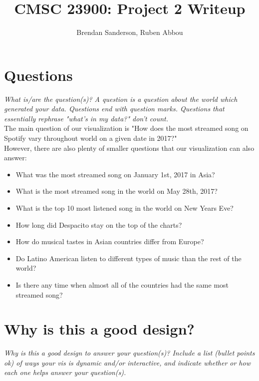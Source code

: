 \documentclass{article}
\begin{document}
\title{CMSC 23900: Project 2 Writeup}
\author{Brendan Sanderson, Ruben Abbou}
\maketitle

\section{Questions}
\textit{What is/are the question(s)? A question is a question about the world which generated your data. Questions end with question marks. Questions that essentially rephrase "what's in my data?" don't count.} \\

The main question of our visualization is "How does the most streamed song on Spotify vary throughout world on a given date in 2017?" \\

However, there are also plenty of smaller questions that our visualization can also answer:
\begin{itemize}
\item What was the most streamed song on January 1st, 2017 in Asia?
\item What is the most streamed song in the world on May 28th, 2017?
\item What is the top 10 most listened song in the world on New Years Eve?
\item How long did Despacito stay on the top of the charts?
\item How do musical tastes in Asian countries differ from Europe?
\item Do Latino American listen to different types of music than the rest of the world?
\item Is there any time when almost all of the countries had the same most streamed song?
\end{itemize}

\section{Why is this a good design?}
\textit{Why is this a good design to answer your question(s)? Include a list (bullet points ok) of ways your vis is dynamic and/or interactive, and indicate whether or how each one helps answer your question(s).}
\end{document}
